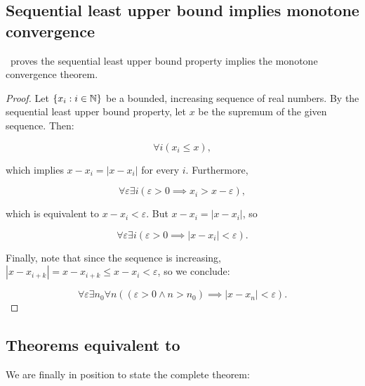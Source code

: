 \documentclass[../main.tex]{memoir}
\begin{document}
\subsection{Sequential least upper bound implies monotone convergence}

\begin{theorem}
  \label{thm:lub-mc}
  \rca\ proves the sequential least upper bound property implies the monotone convergence theorem.
\end{theorem}
\begin{proof}
  Let $\{x_i: i \in \mathbb{N}\}$ be a bounded, increasing sequence of real numbers. By the sequential least upper bound property, let $x$ be the supremum of the given sequence. Then:

  \[ \forall i (x_i \le x), \]

  which implies $x - x_i = |x - x_i|$ for every $i$. Furthermore,

  \[ \forall \varepsilon \exists i (\varepsilon > 0 \implies x_i > x - \varepsilon), \]

  which is equivalent to $x - x_i < \varepsilon$. But $x - x_i = |x - x_i|$, so

  \[ \forall \varepsilon \exists i (\varepsilon > 0 \implies |x - x_i| < \varepsilon). \]

  Finally, note that since the sequence is increasing, $|x - x_{i + k}| = x - x_{i + k} \le x - x_i < \varepsilon$, so we conclude:

  \[ \forall \varepsilon \exists n_0 \forall n ((\varepsilon > 0 \land n > n_0) \implies |x - x_n| < \varepsilon). \]
\end{proof}

\subsection{Theorems equivalent to \aca}

We are finally in position to state the complete theorem:
\end{document}
